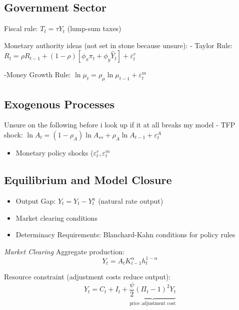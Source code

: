 \documentclass[11pt,preprint]{elsarticle}
\numberwithin{equation}{section}
\numberwithin{figure}{section}
\numberwithin{table}{section}
\def\tightlist{} %
\begin{document}
\newpage

\subsection{Government Sector}\label{government-sector}

Fiscal rule: \(T_t = \tau Y_t\) (lump-sum taxes)

Monetary authority ideas (not set in stone because unsure): - Taylor
Rule:
\(R_t = \rho R_{t-1} + (1-\rho)[\phi_\pi \pi_t + \phi_y \hat{Y}_t] + \varepsilon_t^r\)

-Money Growth Rule:
\(\ln \mu_t = \rho_\mu \ln \mu_{t-1} + \varepsilon_t^m\)

\subsection{Exogenous Processes}\label{exogenous-processes}

Unsure on the following before i look up if it at all breaks my model -
TFP shock:
\(\ln A_t = (1-\rho_A)\ln A_{ss} + \rho_A \ln A_{t-1} + \varepsilon_t^A\)

\begin{itemize}
\tightlist
\item
  Monetary policy shocks (\(\varepsilon_t^r, \varepsilon_t^m\)
\end{itemize}

\subsection{Equilibrium and Model
Closure}\label{equilibrium-and-model-closure}

\begin{itemize}
\item
  Output Gap: \(\hat{Y}_t = Y_t - Y_t^n\) (natural rate output)
\item
  Market clearing conditions
\item
  Determinacy Requirements: Blanchard-Kahn conditions for policy rules
\end{itemize}

\emph{Market Clearing} Aggregate production: \begin{equation}
Y_t = A_t K_{t-1}^{\alpha} h_t^{1-\alpha}
\label{aggregate_production}
\end{equation}

Resource constraint (adjustment costs reduce output): \begin{equation}
Y_t = C_t + I_t + \underbrace{\frac{\psi}{2} (\Pi_t - 1)^2 Y_t}_{\text{price adjustment cost}}
\label{resource_constraint}
\end{equation}
\end{document}
